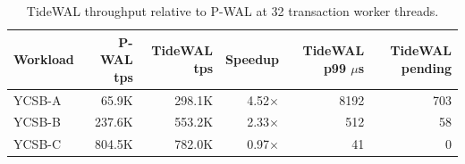 \begin{table}[t]
  \centering
  \caption{TideWAL throughput relative to P-WAL at 32 transaction worker threads.}
  \label{tab:tidewal-speedup-32worker}
  \small
  \begin{tabular}{lrrrrr}
    \hline
    Workload & P-WAL tps & TideWAL tps & Speedup & TideWAL p99 $\mu$s & TideWAL pending \\
    \hline
    YCSB-A & 65.9K & 298.1K & 4.52$\times$ & 8192 & 703 \\
    YCSB-B & 237.6K & 553.2K & 2.33$\times$ & 512 & 58 \\
    YCSB-C & 804.5K & 782.0K & 0.97$\times$ & 41 & 0 \\
    \hline
  \end{tabular}
\end{table}
